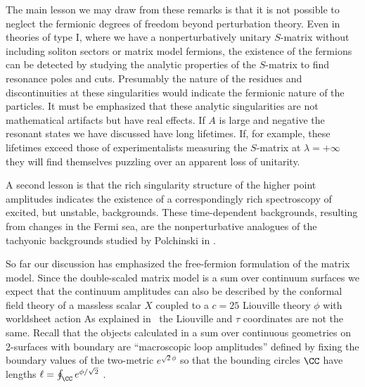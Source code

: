 The main lesson we may draw from these remarks is that it is 
not possible to neglect the fermionic degrees of freedom 
beyond perturbation theory. Even in theories of type I, where
we have a nonperturbatively
unitary $S$-matrix without including soliton sectors or matrix
model fermions,
the existence of the fermions can be detected by studying the 
analytic properties of the $S$-matrix to find resonance poles
and cuts. Presumably the nature of the residues and discontinuities 
at these singularities would indicate the fermionic 
nature of the particles. It must be emphasized that these 
analytic singularities are not mathematical artifacts but have
real effects. If $A$ is large and negative the resonant 
states we have discussed have long lifetimes. If, for example,
these lifetimes exceed those of experimentalists measuring
the $S$-matrix at $\lambda=+\infty$ they will find themselves
puzzling over an apparent loss of unitarity.
 
A second lesson is that the rich singularity structure
of the higher point amplitudes indicates the existence of 
a correspondingly rich spectroscopy of excited, but unstable, 
backgrounds. These time-dependent backgrounds, resulting from 
changes in the Fermi sea, are the nonperturbative analogues of
the tachyonic backgrounds studied by Polchinski in 
\joefluid.
 
 
 
So far our discussion has emphasized the free-fermion 
formulation of the matrix model. Since the double-scaled
matrix model is a sum over continuum surfaces we expect
that the continuum amplitudes can also be described by 
the conformal field theory of a massless scalar $X$ 
coupled to a $c=25$ Liouville theory $\phi$ with worldsheet
action
\eqn{} 
As explained in \lpsflds\ the Liouville and $\tau$
coordinates are not the same. Recall that the objects calculated
in a sum over continuous geometries on 2-surfaces with 
boundary are ``macroscopic loop 
amplitudes'' defined by fixing the boundary values of the 
two-metric $e^{\sqrt{2}\phi}$ so that the bounding 
circles $\CC$ have lengths $\ell=\oint_\CC e^{\phi/\sqrt{2}}$
\nref{}%
\nref{}%
\nref{}%
\nref{}%
\nref{}%
. 
 
